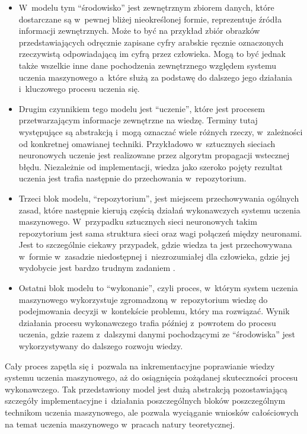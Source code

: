 \begin{itemize}

  \item W~modelu tym ``środowisko'' jest zewnętrznym zbiorem danych, które dostarczane są w~pewnej bliżej nieokreślonej formie, reprezentuje źródła informacji zewnętrznych.
        Może to być na przykład zbiór obrazków przedstawiających odręcznie zapisane cyfry arabskie ręcznie oznaczonych rzeczywistą odpowiadającą im cyfrą przez człowieka.
        Mogą to być jednak także wszelkie inne dane pochodzenia zewnętrznego względem systemu uczenia maszynowego a~które służą za podstawę do dalszego jego działania i~kluczowego procesu uczenia się.


  \item Drugim czynnikiem tego modelu jest ``uczenie'', które jest procesem przetwarzającym informacje zewnętrzne na wiedzę.
        Terminy tutaj występujące są abstrakcją i~mogą oznaczać wiele różnych rzeczy, w~zależności od konkretnej omawianej techniki.
        Przykładowo w~sztucznych sieciach neuronowych uczenie jest realizowane przez algorytm propagacji wstecznej błędu.
        Niezależnie od implementacji, wiedza jako szeroko pojęty rezultat uczenia jest trafia następnie do przechowania w~repozytorium.

  \item Trzeci blok modelu, ``repozytorium'', jest miejscem przechowywania ogólnych zasad, które następnie kierują częścią działań wykonawczych systemu uczenia maszynowego.
        W~przypadku sztucznych sieci neuronowych takim repozytorium jest sama struktura sieci oraz wagi połączeń między neuronami.
        Jest to szczególnie ciekawy przypadek, gdzie wiedza ta jest przechowywana w~formie w~zasadzie niedostępnej i~niezrozumiałej dla człowieka, gdzie jej wydobycie jest bardzo trudnym zadaniem \cite{boger1997knowledge}.

  \item Ostatni blok modelu to ``wykonanie'', czyli proces, w~którym system uczenia maszynowego wykorzystuje zgromadzoną w~repozytorium wiedzę do podejmowania decyzji w~kontekście problemu, który ma rozwiązać.
        Wynik działania procesu wykonawczego trafia później z~powrotem do procesu uczenia, gdzie razem z~dalszymi danymi pochodzącymi ze ``środowiska'' jest wykorzystywany do dalszego rozwoju wiedzy.

\end{itemize}

Cały proces zapętla się i~pozwala na inkrementacyjne poprawianie wiedzy systemu uczenia maszynowego, aż do osiągnięcia pożądanej skuteczności procesu wykonawczego.
Tak przedstawiony model jest dużą abstrakcją pozostawiającą szczegóły implementacyjne i~działania poszczególnych bloków poszczególnym technikom uczenia maszynowego, ale pozwala wyciąganie wniosków całościowych na temat uczenia maszynowego w~pracach natury teoretycznej.

